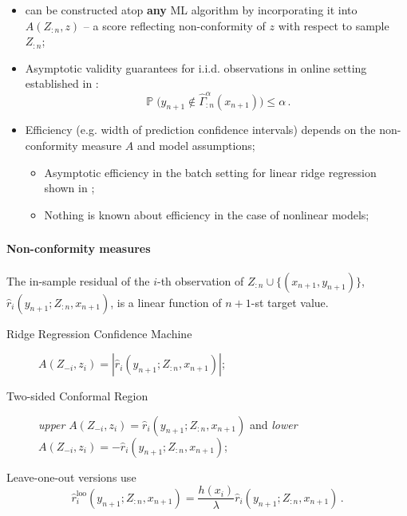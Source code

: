 \documentclass[t]{beamer}  %
\newcommand{\pr}{\mathop{\mathbb{P}}\nolimits}
\begin{document}
\begin{frame}
  \frametitle{\insertsection}
  \begin{itemize}
    \item can be constructed atop \textbf{any} ML algorithm by incorporating it into
    $A(Z_{:n}, z)$ -- a score reflecting non-conformity of $z$ with respect to sample
    $Z_{:n}$;
    \item Asymptotic validity guarantees for i.i.d. observations in online setting
    established in \cite{vovk2005}:
    $$ \pr\bigl( y_{n+1} \notin \hat{\Gamma}_{:n}^\alpha(x_{n+1}) \bigr) \leq \alpha \,. $$
    \item Efficiency (e.g. width of prediction confidence intervals) depends on the
    non-conformity measure $A$ and model assumptions; \begin{itemize}
      \item Asymptotic efficiency in the batch setting for linear ridge regression shown
      in \cite{burnaevV14};
      \item Nothing is known about efficiency in the case of nonlinear models;
    \end{itemize}
  \end{itemize}
\end{frame}

\begin{frame}[t]\frametitle{\insertection}
  \framesubtitle{Non-conformity measures}
  The in-sample residual of the $i$-th observation of $Z_{:n}\cup\{(x_{n+1}, y_{n+1})\}$,
  $\hat{r}_i(y_{n+1}; Z_{:n}, x_{n+1})$, is a linear function of $n+1$-st target value.

  \begin{description}
    \item[Ridge Regression Confidence Machine] $A(Z_{-i}, z_i) = |\hat{r}_i(y_{n+1}; Z_{:n}, x_{n+1})|$;
    \item[Two-sided Conformal Region]
      \textit{upper} $A(Z_{-i}, z_i) = \hat{r}_i(y_{n+1}; Z_{:n}, x_{n+1})$ and
      \textit{lower} $A(Z_{-i}, z_i) = -\hat{r}_i(y_{n+1}; Z_{:n}, x_{n+1})$;
  \end{description}

  Leave-one-out versions use
  $$ \hat{r}^{\text{loo}}_i(y_{n+1}; Z_{:n}, x_{n+1})
    = \frac{h(x_i)}{\lambda} \hat{r}_i(y_{n+1}; Z_{:n}, x_{n+1})\,. $$
\end{frame}
\end{document}
